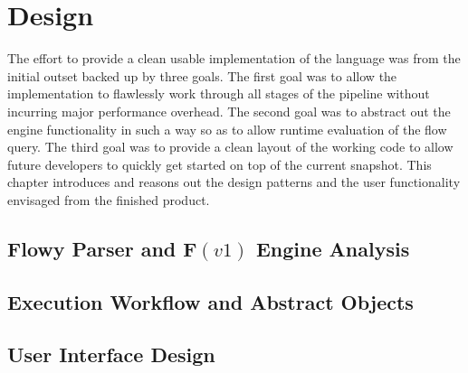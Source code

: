 \chapter{Design}\label{ch:design}

The effort to provide a clean usable implementation of the language was from
the initial outset backed up by three goals. The first goal was to allow the
implementation to flawlessly work through all stages of the pipeline without
incurring major performance overhead. The second goal was to abstract out the
engine functionality in such a way so as to allow runtime evaluation of the
flow query. The third goal was to provide a clean layout of the working code
to allow future developers to quickly get started on top of the current
snapshot. This chapter introduces and reasons out the design patterns and
the user functionality envisaged from the finished product.

\section{Flowy Parser and F$(v1)$ Engine Analysis}\label{sec:adt-workflow}


\section{Execution Workflow and Abstract Objects}\label{sec:adt-workflow}


\section{User Interface Design}\label{sec:engine-interface}

